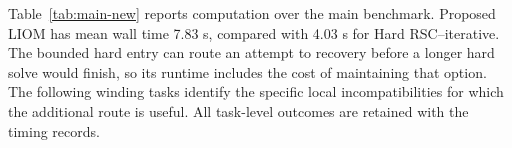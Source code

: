 Table~\ref{tab:main-new} reports computation over the main benchmark. Proposed LIOM has mean wall time 7.83 s, compared with 4.03 s for Hard RSC--iterative. The bounded hard entry can route an attempt to recovery before a longer hard solve would finish, so its runtime includes the cost of maintaining that option. The following winding tasks identify the specific local incompatibilities for which the additional route is useful. All task-level outcomes are retained with the timing records.
